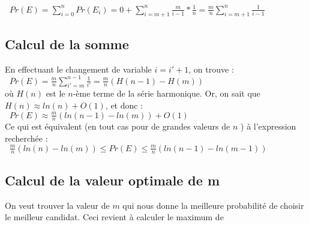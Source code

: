 \documentclass[a4paper,10pt]{article}
\begin{document}
\begin{math}\;\;Pr(E) = \sum_{i=0}^n Pr(E_i) = 0 + \sum_{i=m+1}^n \frac{m}{i-1} * \frac{1}{n} = \frac{m}{n} \sum_{i=m+1}^{n} \frac{1}{i-1}\end{math}

\subsection{Calcul de la somme}

En effectuant le changement de variable
\begin{math}i = i'+1\end{math},
on trouve :\\

\begin{math}\;\;Pr(E) = \frac{m}{n} \sum_{i'=m}^{n-1} \frac{1}{i'} = \frac{m}{n} (H(n-1) - H(m))\end{math}\\

où \begin{math}H(n)\end{math} est le \begin{math}n\end{math}-ème terme de la série harmonique. Or, on sait que
\begin{math}H(n) \approx ln(n) + O(1)\end{math}, et donc :\\

\begin{math}\;\;Pr(E) \approx \frac{m}{n} (ln(n-1) - ln(m)) + O(1)\end{math}\\

Ce qui est équivalent (en tout cas pour de grandes valeurs de
\begin{math}n\end{math}
) à l'expression recherchée :\\

\begin{math}\;\;\frac{m}{n} (ln(n) - ln(m)) \leq Pr(E) \leq \frac{m}{n} (ln(n-1) - ln(m-1))\end{math}\\

\subsection{Calcul de la valeur optimale de m}

On veut trouver la valeur de 
\begin{math}m\end{math}
qui nous donne la meilleure probabilité de choisir le meilleur candidat. Ceci revient à calculer le maximum de\\
\end{document}
